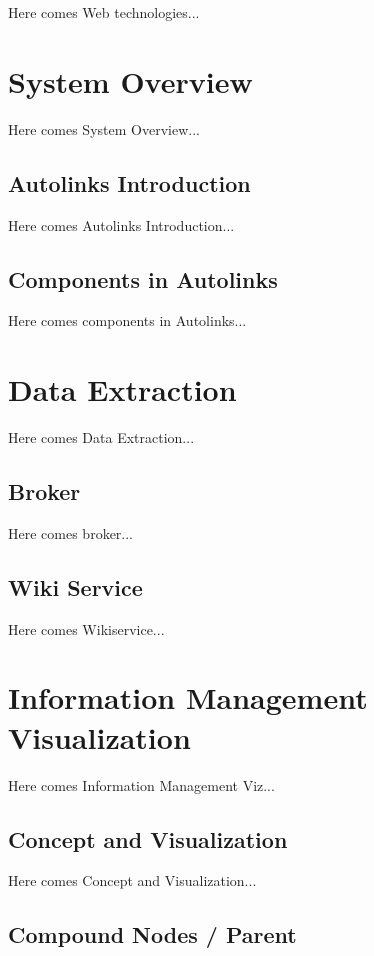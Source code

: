 \documentclass[
    fontsize=12pt,
    headings=small,
    parskip=half,           %
    bibliography=totoc,
    numbers=noenddot,       %
    open=any,               %
    ]{scrreprt}
\begin{document}
Here comes Web technologies...



\chapter{System Overview}

Here comes System Overview...

\section{Autolinks Introduction}

Here comes Autolinks Introduction...


\section{Components in Autolinks}

Here comes components in Autolinks...


\chapter{Data Extraction}

Here comes Data Extraction...

\section{Broker}

Here comes broker...

\section{Wiki Service}

Here comes Wikiservice...


\chapter{Information Management Visualization}

Here comes Information Management Viz...

\section{Concept and Visualization}

Here comes Concept and Visualization...

\section{Compound Nodes / Parent}
\end{document}
